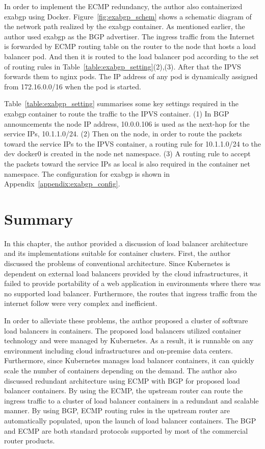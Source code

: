 In order to implement the ECMP redundancy, the author also containerized exabgp using Docker.
Figure~\ref{fig:exabgp_schem} shows a schematic diagram of the network path realized by the exabgp container.
As mentioned earlier, the author used exabgp as the BGP advertiser. 
The ingress traffic from the Internet is forwarded by ECMP routing table on the router to the node that hosts a load balancer pod.
And then it is routed to the load balancer pod according to the set of routing rules in Table~\ref{table:exabgp_setting}(2),(3).
After that the IPVS forwards them to nginx pods.
The IP address of any pod is dynamically assigned from 172.16.0.0/16 when the pod is started. 

Table~\ref{table:exabgp_setting} summarises some key settings required in the exabgp container to route the traffic to the IPVS container.
(1) In BGP announcements the node IP address, 10.0.0.106 is used as the next-hop for the service IPs, 10.1.1.0/24.
(2) Then on the node, in order to route the packets toward the service IPs to the IPVS container, 
a routing rule for 10.1.1.0/24 to the dev docker0 is created in the node net namespace. 
(3) A routing rule to accept the packets toward the service IPs as local is also required in the container net namespace. 
The configuration for exabgp is shown in Appendix~\ref{appendix:exabgp_config}.

\FloatBarrier

\section{Summary}

In this chapter, the author provided a discussion of load balancer architecture and its implementations suitable for container clusters.
%
First, the author discussed the problems of conventional architecture.
Since Kubernetes is dependent on external load balancers provided by the cloud infrastructures,
it failed to provide portability of a web application in environments where there was no supported load balancer.
Furthermore, the routes that ingress traffic from the internet follow were very complex and inefficient.

In order to alleviate these problems, the author proposed a cluster of software load balancers in containers.
The proposed load balancers utilized container technology and were managed by Kubernetes.
As a result, it is runnable on any environment including cloud infrastructures and on-premise data centers.
Furthermore, since Kubernetes manages load balancer containers, it can quickly scale the number of containers depending on the demand.
%
The author also discussed redundant architecture using ECMP with BGP for proposed load balancer containers.
By using the ECMP, the upstream router can route the ingress traffic to a cluster of load balancer containers in a redundant and scalable manner.
By using BGP, ECMP routing rules in the upstream router are automatically populated, upon the launch of load balancer containers.
The BGP and ECMP are both standard protocols supported by most of the commercial router products.

